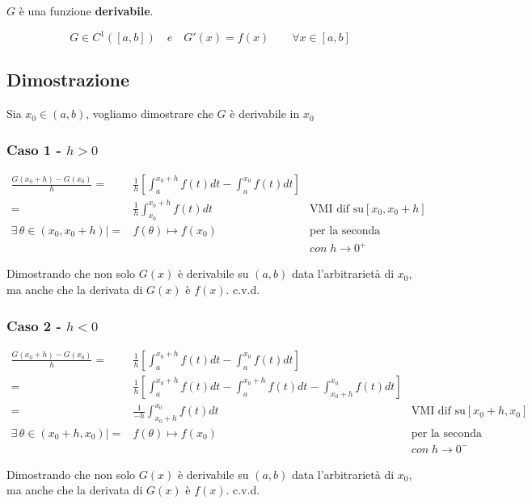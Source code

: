 \documentclass[../dimostrazioni]{subfiles}
\begin{document}
                        \(G\) è una funzione \textbf{derivabile}.

                        \[G \in C^{1}([a, b]) \quad e \quad G'(x) = f(x) \qquad \forall x \in [a,b] \]
        
                    \subsection*{Dimostrazione}

                        Sia \(x_0 \in (a,b) \), vogliamo dimostrare che \(G\) è derivabile in \(x_0\)


                        \subsubsection*{Caso 1 - \(h>0\)}

                            \begin{align*}
                                \frac{G(x_0+h) - G(x_0)}{h} =& \frac{1}{h} \left[ \int_{a}^{x_0+h} f(t) dt - \int_{a}^{x_0} f(t)dt \right] \\
                                                            =& \frac{1}{h} \int_{x_0}^{x_0+h}f(t) dt & \text{VMI dif su} [x_0, {x_0} +h]\\
                                \exists \, \theta \in (x_0, x_0+h) | =& f(\theta) \longmapsto f(x_0)          & \text{per la seconda proprietà del VMI}& \\
                                &                            &  con \; h \rightarrow 0^{+}&
                            \end{align*}
                            
                            Dimostrando che non solo \(G(x)\) è derivabile su \((a,b)\) data l'arbitrarietà di \(x_0\), 
                            ma anche che la derivata di \(G(x)\) è \(f(x)\). c.v.d.

                        \subsubsection*{Caso 2 - \(h<0\)}

                            \begin{align*}
                                \frac{G(x_0+h) - G(x_0)}{h} =& \frac{1}{h} \left[ \int_{a}^{x_0+h} f(t) dt - \int_{a}^{x_0} f(t)dt \right] \\
                                                            =& \frac{1}{h} \left[ \int_{a}^{x_0+h} f(t) dt - \int_{a}^{x_0+h} f(t)dt -\int_{x_0+h}^{x_0} f(t)dt \right] \\
                                                            =& \frac{1}{-h} \int_{x_0+h}^{x_0}f(t) dt & \text{VMI dif su} [x_0 + h, x_0]\\
                                \exists \, \theta \in (x_0+h, x_0) | =& f(\theta) \longmapsto f(x_0)          & \text{per la seconda proprietà del VMI}& \\
                                &                            &  con \; h \rightarrow 0^{-}&
                            \end{align*}
                            
                            Dimostrando che non solo \(G(x)\) è derivabile su \((a,b)\) data l'arbitrarietà di \(x_0\), 
                            ma anche che la derivata di \(G(x)\) è \(f(x)\). c.v.d.            
\end{document}
